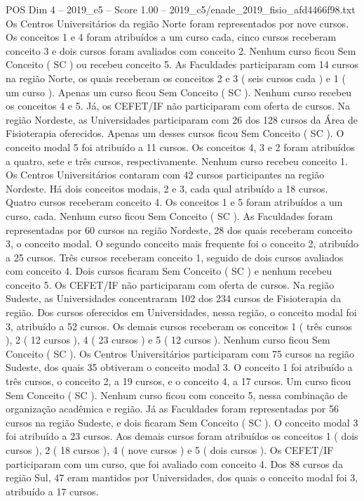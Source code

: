 \begin{textsample}{POS Dim 4 – 2019\_c5 – Score 1.00 – 2019\_c5/enade\_2019\_fisio\_afd4466f98.txt}
Os Centros Universitários da região Norte foram representados por nove cursos.
Os conceitos 1 e 4 foram atribuídos a um curso cada, cinco cursos receberam conceito 3 e dois cursos foram avaliados com conceito 2.
Nenhum curso ficou Sem Conceito ( SC ) ou recebeu conceito 5.
As Faculdades participaram com 14 cursos na região Norte, os quais receberam os conceitos 2 e 3 ( seis cursos cada ) e 1 ( um curso ).
Apenas um curso ficou Sem Conceito ( SC ).
Nenhum curso recebeu os conceitos 4 e 5.
Já, os CEFET/IF não participaram com oferta de cursos.
Na região Nordeste, as Universidades participaram com 26 dos 128 cursos da Área de Fisioterapia oferecidos.
Apenas um desses cursos ficou Sem Conceito ( SC ).
O conceito modal 5 foi atribuído a 11 cursos.
Os conceitos 4, 3 e 2 foram atribuídos a quatro, sete e três cursos, respectivamente.
Nenhum curso recebeu conceito 1.
Os Centros Universitários contaram com 42 cursos participantes na região Nordeste.
Há dois conceitos modais, 2 e 3, cada qual atribuído a 18 cursos.
Quatro cursos receberam conceito 4.
Os conceitos 1 e 5 foram atribuídos a um curso, cada.
Nenhum curso ficou Sem Conceito ( SC ).
As Faculdades foram representadas por 60 cursos na região Nordeste, 28 dos quais receberam conceito 3, o conceito modal.
O segundo conceito mais frequente foi o conceito 2, atribuído a 25 cursos.
Três cursos receberam conceito 1, seguido de dois cursos avaliados com conceito 4.
Dois cursos ficaram Sem Conceito ( SC ) e nenhum recebeu conceito 5.
Os CEFET/IF não participaram com oferta de cursos.
Na região Sudeste, as Universidades concentraram 102 dos 234 cursos de Fisioterapia da região.
Dos cursos oferecidos em Universidades, nessa região, o conceito modal foi 3, atribuído a 52 cursos.
Os demais cursos receberam os conceitos 1 ( três cursos ), 2 ( 12 cursos ), 4 ( 23 cursos ) e 5 ( 12 cursos ).
Nenhum curso ficou Sem Conceito ( SC ).
Os Centros Universitários participaram com 75 cursos na região Sudeste, dos quais 35 obtiveram o conceito modal 3.
O conceito 1 foi atribuído a três cursos, o conceito 2, a 19 cursos, e o conceito 4, a 17 cursos.
Um curso ficou Sem Conceito ( SC ).
Nenhum curso ficou com conceito 5, nessa combinação de organização acadêmica e região.
Já as Faculdades foram representadas por 56 cursos na região Sudeste, e dois ficaram Sem Conceito ( SC ).
O conceito modal 3 foi atribuído a 23 cursos.
Aos demais cursos foram atribuídos os conceitos 1 ( dois cursos ), 2 ( 18 cursos ), 4 ( nove cursos ) e 5 ( dois cursos ).
Os CEFET/IF participaram com um curso, que foi avaliado com conceito 4.
Dos 88 cursos da região Sul, 47 eram mantidos por Universidades, dos quais o conceito modal foi 3, atribuído a 17 cursos.

\end{textsample}
